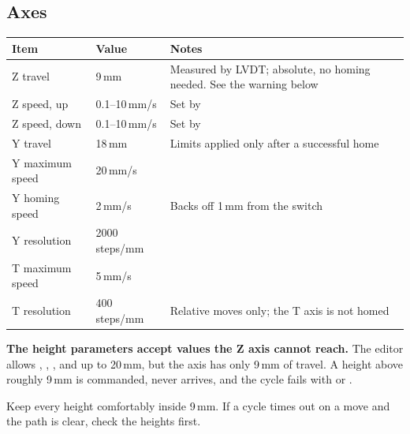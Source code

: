 %
%

\subsection*{Axes}

\begin{center}\small
\begin{tabular}{@{}L{34mm}L{30mm}L{55mm}@{}}
\toprule
\textbf{Item} & \textbf{Value} & \textbf{Notes} \\
\midrule
Z travel            & 9\,mm          & Measured by LVDT; absolute, no homing
                                       needed. See the warning below \\
Z speed, up         & 0.1--10\,mm/s  & Set by  \\
Z speed, down       & 0.1--10\,mm/s  & Set by  \\
Y travel            & 18\,mm         & Limits applied only after a successful home \\
Y maximum speed     & 20\,mm/s       & \\
Y homing speed      & 2\,mm/s        & Backs off 1\,mm from the switch \\
Y resolution        & 2000 steps/mm  & \\
T maximum speed     & 5\,mm/s        & \\
T resolution        & 400 steps/mm   & Relative moves only; the T axis is not homed \\
\bottomrule
\end{tabular}
\end{center}

\begin{wbwarning}
\textbf{The height parameters accept values the Z axis cannot reach.} The
editor allows , ,
,  and  up to
20\,mm, but the axis has only 9\,mm of travel. A height above roughly 9\,mm is
commanded, never arrives, and the cycle fails with  or
.

Keep every height comfortably inside 9\,mm. If a cycle times out on a move and
the path is clear, check the heights first.
\end{wbwarning}

